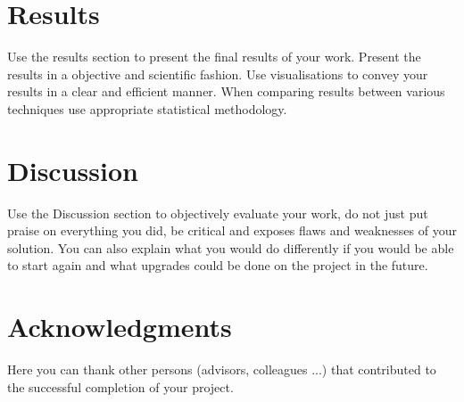\documentclass[fleqn,moreauthors,10pt]{ds_report}
\begin{document}
\section*{Results}

Use the results section to present the final results of your work. Present the results in a objective and scientific fashion. Use visualisations to convey your results in a clear and efficient manner. When comparing results between various techniques use appropriate statistical methodology.


\section*{Discussion}

Use the Discussion section to objectively evaluate your work, do not just put praise on everything you did, be critical and exposes flaws and weaknesses of your solution. You can also explain what you would do differently if you would be able to start again and what upgrades could be done on the project in the future.



\section*{Acknowledgments}

Here you can thank other persons (advisors, colleagues ...) that contributed to the successful completion of your project.




\end{document}
